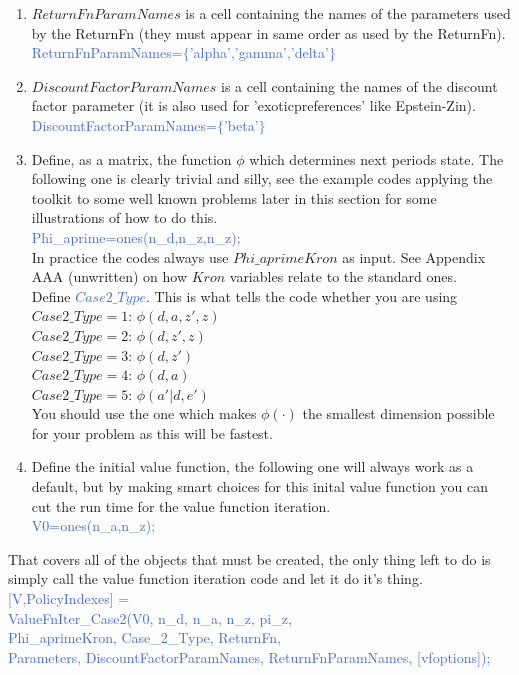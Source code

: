 \begin{enumerate}
 \item $ReturnFnParamNames$ is a cell containing the names of the parameters used by the ReturnFn (they must appear in same order as used by the ReturnFn). \\
     \textcolor{RoyalBlue}{ReturnFnParamNames=$\{$'alpha','gamma','delta'$\}$}
 \item $DiscountFactorParamNames$ is a cell containing the names of the discount factor parameter (it is also used for 'exoticpreferences' like Epstein-Zin). \\
     \textcolor{RoyalBlue}{DiscountFactorParamNames=$\{$'beta'$\}$}
 \item Define, as a matrix, the function $\phi$ which determines next periods state. The following one is clearly trivial and silly, see the example
     codes applying the toolkit to some well known problems later in this section for some illustrations of how to do this. \\
     \textcolor{RoyalBlue}{Phi\_{}aprime=ones(n\_{}d,n\_{}z,n\_{}z);} \\
     In practice the codes always use $Phi\_{}aprimeKron$ as input. See Appendix AAA (unwritten) on how $Kron$ variables relate to the standard ones. \\
     Define \textcolor{RoyalBlue}{$Case2\_{}Type$}. This is what tells the code whether you are using \\
     $Case2\_{}Type=1$: $\phi (d,a,z',z)$ \\
     $Case2\_{}Type=2$: $\phi (d,z',z)$ \\
     $Case2\_{}Type=3$: $\phi (d,z')$ \\
     $Case2\_{}Type=4$: $\phi (d,a)$ \\
     $Case2\_{}Type=5$: $\phi (a'|d,e')$ \\
     You should use the one which makes $\phi(\cdot)$ the smallest dimension possible for your problem as this will be fastest.
 \item Define the initial value function, the following one will always work as a default, but by making smart choices for this inital value function you can
     cut the run time for the value function iteration. \\
     \textcolor{RoyalBlue}{V0=ones(n\_{}a,n\_{}z);}
\end{enumerate}
That covers all of the objects that must be created, the only thing left to do is simply call the value function iteration code and let it do it's thing. \\
\textcolor{RoyalBlue}{[V,PolicyIndexes] =} \\
\indent \textcolor{RoyalBlue}{  ValueFnIter\_{}Case2(V0, n\_{}d, n\_{}a, n\_{}z, pi\_{}z,} \\
\indent \indent \textcolor{RoyalBlue}{   Phi\_{}aprimeKron, Case\_{}2\_{}Type, ReturnFn,} \\
\indent \indent \textcolor{RoyalBlue}{   Parameters, DiscountFactorParamNames, ReturnFnParamNames, [vfoptions]);}

